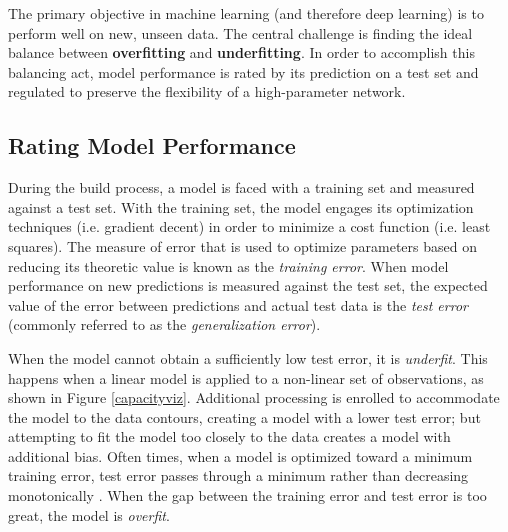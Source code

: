 The primary objective in machine learning (and therefore deep learning) is to perform well on new, unseen data.  The central challenge is finding the ideal balance between \textbf{overfitting} and \textbf{underfitting}.  In order to accomplish this balancing act, model performance is rated by its prediction on a test set and regulated to preserve the flexibility of a high-parameter network.

\subsection{Rating Model Performance}


During the build process, a model is faced with a training set and measured against a test set.  With the training set, the model engages its optimization techniques (i.e. gradient decent) in order to minimize a cost function (i.e. least squares).  The measure of error that is used to optimize parameters based on reducing its theoretic value is known as the \textit{training error}.  When model performance on new predictions is measured against the test set, the expected value of the error between predictions and actual test data is the \textit{test error} (commonly referred to as the \textit{generalization error}). \cite{Goodfellow-et-al-2016}

 When the model cannot obtain a sufficiently low test error, it is \textit{underfit}.  This happens when a linear model is applied to a non-linear set of observations, as shown in Figure \ref{capacityviz}.  Additional processing is enrolled to accommodate the model to the data contours, creating a model with a lower test error; but attempting to fit the model too closely to the data creates a model with additional bias.  Often times, when a model is optimized toward a minimum training error, test error passes through a minimum rather than decreasing monotonically \cite{mackay1992bayesian}.  When the gap between the training error and test error is too great, the model is \textit{overfit}.
 
